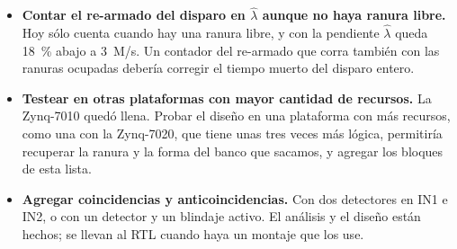 \begin{itemize}
    estabilizar también el detector hace falta una línea de la fuente.
  \item \textbf{Contar el re-armado del disparo en $\hat\lambda$ aunque no haya
    ranura libre.} Hoy  sólo cuenta cuando hay una ranura
    libre, y con la pendiente $\hat\lambda$ queda \qty{18}{\percent} abajo a
    3~M/s. Un contador del re-armado que corra también con las ranuras ocupadas
    debería corregir el tiempo muerto del disparo entero.
  \item \textbf{Testear en otras plataformas con mayor cantidad de recursos.} La
    Zynq-7010 quedó llena. Probar el diseño en una plataforma con más recursos,
    como una con la Zynq-7020, que tiene unas tres veces más lógica, permitiría
    recuperar la ranura y la forma del banco que sacamos, y agregar los bloques
    de esta lista.
  \item \textbf{Agregar coincidencias y anticoincidencias.} Con dos detectores
    en IN1 e IN2, o con un detector y un blindaje activo. El análisis y el
    diseño están hechos; se llevan al RTL cuando haya un montaje que los use.
\end{itemize}

